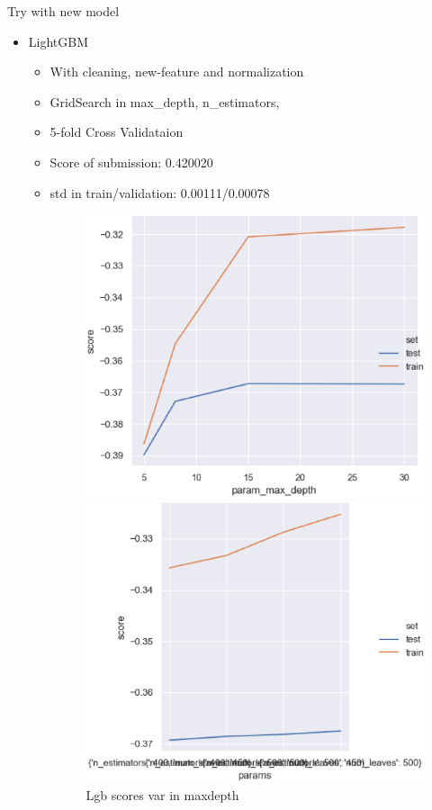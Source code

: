 \documentclass[
 size=12pt,
 paper=smartboard, %
 mode=present, %
 display=slides, %
style=tuliplab,
pauseslide,
fleqn,leqno]{powerdot}
\begin{document}
\begin{slide}{Try with new model}
  \begin{itemize}
    \item LightGBM
    \begin{itemize}
      \item With cleaning, new-feature and normalization
      \item GridSearch in max_depth, n_estimators, 
      \item 5-fold Cross Validataion \pause
      \item Score of submission: 0.420020
      \item std in train/validation: 0.00111/0.00078 \pause 
      \begin{figure}[h]
        \begin{minipage}[t]{0.4\linewidth}
          \includegraphics[width=1.0\textwidth]{figures2/lgb_max_depth.eps}
          \caption{Lgb scores var in maxdepth}
          \label{fig:lgb-max-depth}
        \end{minipage}
        \hfill
        \begin{minipage}[t]{0.4\linewidth}
          \centering
          \includegraphics[width=1.0\textwidth]{figures2/lgb_n_leaves.eps}

\end{minipage}
\end{figure}
\end{itemize}
\end{itemize}
\end{slide}
\end{document}
